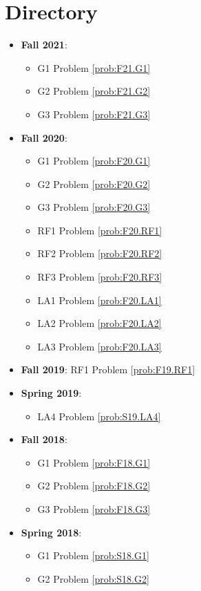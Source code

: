 \documentclass{article}
\theoremstyle{definition}
\begin{document}
\tableofcontents

\section{Directory}

\begin{itemize}
	\item \textbf{Fall 2021}:
	\begin{itemize}
	\item G1 Problem \ref{prob:F21.G1} 
	\item G2 Problem \ref{prob:F21.G2}
	\item G3 Problem \ref{prob:F21.G3}
	\end{itemize}
	\item \textbf{Fall 2020}:
	\begin{itemize}
	\item G1 Problem \ref{prob:F20.G1} 
	\item G2 Problem \ref{prob:F20.G2}
	\item G3 Problem \ref{prob:F20.G3}
	\item RF1 Problem \ref{prob:F20.RF1}
	\item RF2 Problem \ref{prob:F20.RF2}
	\item RF3 Problem \ref{prob:F20.RF3}
	\item LA1 Problem \ref{prob:F20.LA1}
	\item LA2 Problem \ref{prob:F20.LA2}
	\item LA3 Problem \ref{prob:F20.LA3}	
	\end{itemize}
	\item \textbf{Fall 2019}: RF1 Problem \ref{prob:F19.RF1}
	\item \textbf{Spring 2019}:
	\begin{itemize}
	\item LA4 Problem \ref{prob:S19.LA4}	
	\end{itemize}
	\item \textbf{Fall 2018}: 
	\begin{itemize}
		\item G1 Problem \ref{prob:F18.G1}
		\item G2 Problem \ref{prob:F18.G2}
		\item G3 Problem \ref{prob:F18.G3}
	\end{itemize}
	\item \textbf{Spring 2018}:
	\begin{itemize}
		\item G1 Problem \ref{prob:S18.G1}
		\item G2 Problem \ref{prob:S18.G2}

\end{itemize}
\end{itemize}
\end{document}
